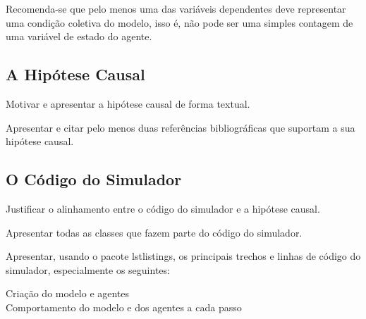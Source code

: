 Recomenda-se que pelo menos uma das variáveis dependentes deve representar uma condição coletiva do modelo, isso é, não pode ser uma simples contagem de uma variável de estado do agente.

\subsection{A Hipótese Causal}

Motivar e apresentar a hipótese causal de forma textual.

Apresentar e citar pelo menos duas referências bibliográficas que suportam a sua hipótese causal.






\subsection{O Código do Simulador}

Justificar o alinhamento entre o código do simulador e a hipótese causal.

Apresentar todas as classes que fazem parte do código do simulador.

Apresentar, usando o pacote lstlistings, os principais trechos e linhas de código do simulador, especialmente os seguintes:
\begin{description}
\item [Criação do modelo e agentes]
\item [Comportamento do modelo e dos agentes a cada passo]
\end{description}

